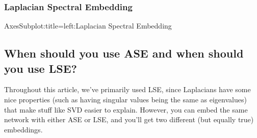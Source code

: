 \documentclass[letterpaper,10pt,english]{jupyterBook}
\begin{document}
\begin{sphinxVerbatim}[commandchars=\\\{\}]
  
\end{sphinxVerbatim}

\noindent{}


\subsubsection{Laplacian Spectral Embedding}
\label{\detokenize{representations/ch6/spectral-embedding:laplacian-spectral-embedding}}
\begin{sphinxVerbatim}[commandchars=\\\{\}]
     

  
\end{sphinxVerbatim}

\begin{sphinxVerbatim}[commandchars=\\\{\}]
  
\end{sphinxVerbatim}

\begin{sphinxVerbatim}[commandchars=\\\{\}]
\PYGZlt{}AxesSubplot:title=\PYGZob{}\PYGZsq{}left\PYGZsq{}:\PYGZsq{}Laplacian Spectral Embedding\PYGZsq{}\PYGZcb{}\PYGZgt{}
\end{sphinxVerbatim}

\noindent{}


\subsection{When should you use ASE and when should you use LSE?}
\label{\detokenize{representations/ch6/spectral-embedding:when-should-you-use-ase-and-when-should-you-use-lse}}
\sphinxAtStartPar
Throughout this article, we’ve primarily used LSE, since Laplacians have some nice properties (such as having singular values being the same as eigenvalues) that make stuff like SVD easier to explain. However, you can embed the same network with either ASE or LSE, and you’ll get two different (but equally true) embeddings.
\end{document}
